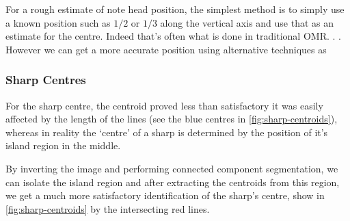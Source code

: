 For a rough estimate of note head position, the simplest method is to simply use a known position such as $1/2$ or $1/3$ along the vertical axis and use that as an estimate for the centre. Indeed that's often what is done in traditional OMR. . . However we can get a more accurate position using alternative techniques as


\subsubsection{Sharp Centres}
For the sharp centre, the centroid proved less than satisfactory it was easily affected by the length of the lines (see the blue centres in \cref{fig:sharp-centroids}), whereas in reality the `centre' of a sharp is determined by the position of it's island region in the middle.

By inverting the image and performing connected component segmentation, we can isolate the island region and after extracting the centroids from this region, we get a much more satisfactory identification of the sharp's centre, show in \cref{fig:sharp-centroids} by the intersecting red lines.

